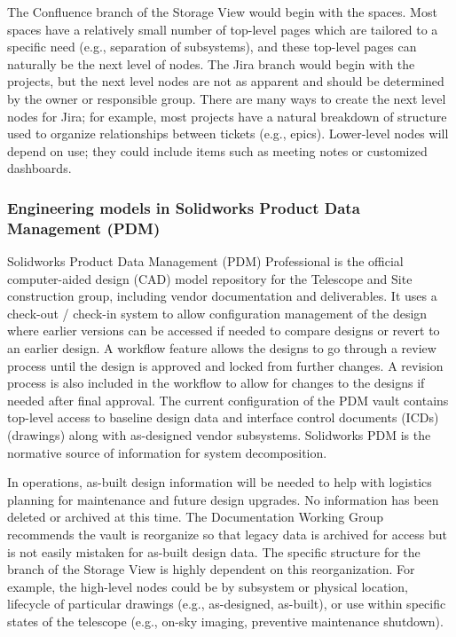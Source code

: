 The Confluence branch of the Storage View would begin with the spaces.
Most spaces have a relatively small number of top-level pages which are tailored to a specific need (e.g., separation of subsystems), and these top-level pages can naturally be the next level of nodes.
The Jira branch would begin with the projects, but the next level nodes are not as apparent and should be determined by the owner or responsible group.
There are many ways to create the next level nodes for Jira; for example, most projects have a natural breakdown of structure used to organize relationships between tickets (e.g., epics).
Lower-level nodes will depend on use; they could include items such as meeting notes or customized dashboards.

\subsubsection{Engineering models in Solidworks Product Data Management (PDM)}

Solidworks Product Data Management (PDM) Professional \citep{PDM-cite} is the official computer-aided design (CAD) model repository for the Telescope and Site construction group, including vendor documentation and deliverables.
It uses a check-out / check-in system to allow configuration management of the design where earlier versions can be accessed if needed to compare designs or revert to an earlier design.
A workflow feature allows the designs to go through a review process until the design is approved and locked from further changes.
A revision process is also included in the workflow to allow for changes to the designs if needed after final approval.
The current configuration of the PDM vault contains top-level access to baseline design data and interface control documents (ICDs) (drawings) along with as-designed vendor subsystems.
Solidworks PDM is the normative source of information for system decomposition.

In operations, as-built design information will be needed to help with logistics planning for maintenance and future design upgrades.
No information has been deleted or archived at this time.
The Documentation Working Group recommends the vault is reorganize so that legacy data is archived for access but is not easily mistaken for as-built design data.
The specific structure for the branch of the Storage View is highly dependent on this reorganization.
For example, the high-level nodes could be by subsystem or physical location, lifecycle of particular drawings (e.g., as-designed, as-built), or use within specific states of the telescope (e.g., on-sky imaging, preventive maintenance shutdown).


